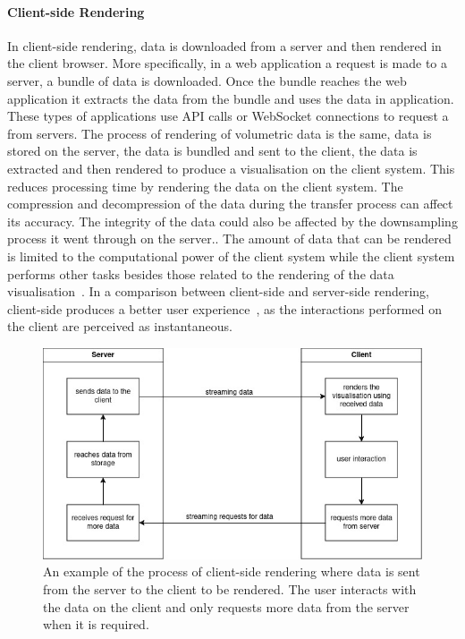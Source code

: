 \paragraph{Client-side Rendering}
In client-side rendering, data is downloaded from a server and then rendered in the client browser.
More specifically, in a web application a request is made to a server, a bundle of data is downloaded.
Once the bundle reaches the web application it extracts the data from the bundle and uses the data in application.
These types of applications use API calls or WebSocket connections to request a from servers.
The process of rendering of volumetric data is the same, data is stored on the server, the data is bundled and sent to the client, the data is extracted and then rendered to produce a visualisation on the client system.
This reduces processing time by rendering the data on the client system.
The compression and decompression of the data during the transfer process can affect its accuracy.
The integrity of the data could also be affected by the downsampling process it went through on the server..
The amount of data that can be rendered is limited to the computational power of the client system while the client system performs other tasks besides those related to the rendering of the data visualisation~\cite{Becker1987}.
In a comparison between client-side and server-side rendering, client-side produces a better user experience~\cite{Iskandar2020}, as the interactions performed on the client are perceived as instantaneous.

\begin{figure}
    \centering
    \includegraphics[width=0.6\linewidth]{figures/client-side-rendering.jpg}
    \caption{An example of the process of client-side rendering where data is sent from the server to the client to be rendered. The user interacts with the data on the client and only requests more data from the server when it is required.}
    \label{fig:client-rendering}
\end{figure}

